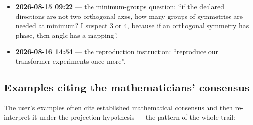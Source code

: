 \documentclass[sigplan,10pt,anonymous,review]{acmart}
\begin{document}
\begin{itemize}
``orthogonality as symmetry yields the conclusion: two groups of
symmetries are necessary to localize a direction; therefore Pat0's
declaration must be two groups of symmetries; any thought-experiment based
on a single dimension is wrong'' (verified: direction localization 16/16
$\times$ 3 seeds).
\item \textbf{2026-08-15 09:22} --- the minimum-groups question: ``if the
declared directions are not two orthogonal axes, how many groups of
symmetries are needed at minimum? I suspect 3 or 4, because if an
orthogonal symmetry has phase, then angle has a mapping''.
\item \textbf{2026-08-16 14:54} --- the reproduction instruction:
``reproduce our transformer experiments once more''.
\end{itemize}

\subsection{Examples citing the mathematicians' consensus}

The user's examples often cite established mathematical consensus and then
re-interpret it under the projection hypothesis --- the pattern of the
whole trail:
\end{document}

